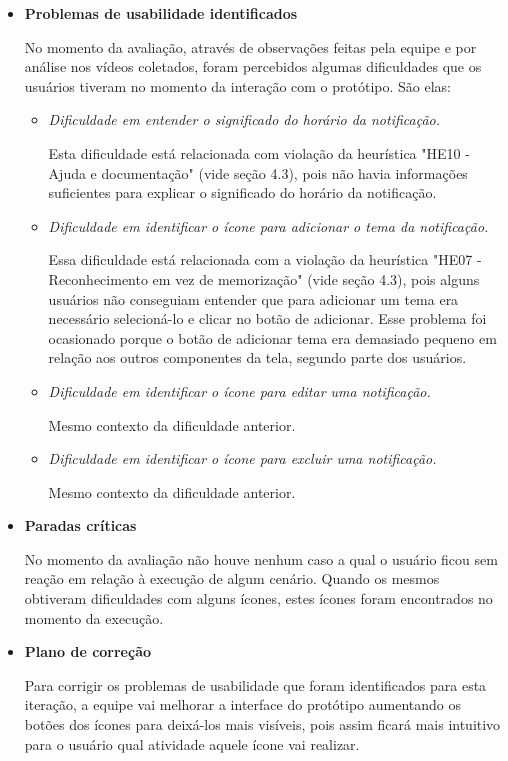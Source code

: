 \begin{itemize}
       \item \textbf{Problemas de usabilidade identificados}
       
	  \subitem No momento da avaliação, através de observações feitas pela equipe e por análise nos vídeos coletados,
	  foram percebidos algumas dificuldades que os usuários tiveram no momento da interação com o protótipo. São elas:
	  
	  \begin{itemize}
	  
	  \item \emph{Dificuldade em entender o significado do horário da notificação.}
	    
	    \subitem Esta dificuldade está relacionada com violação da heurística "HE10 - Ajuda e documentação" (vide seção 4.3),
	    pois não havia informações suficientes para explicar o significado do horário da notificação.
	  
	  \item \emph{Dificuldade em identificar o ícone para adicionar o tema da notificação.}
	    
	    \subitem Essa dificuldade está relacionada com a violação da heurística "HE07 - Reconhecimento em vez de memorização" (vide seção 4.3),
	    pois alguns usuários não conseguiam entender que para adicionar um tema era necessário selecioná-lo e clicar no botão de
	    adicionar. Esse problema foi ocasionado porque o botão de adicionar tema era demasiado pequeno em relação
	    aos outros componentes da tela, segundo parte dos usuários. 
	  
	  \item \emph{Dificuldade em identificar o ícone para editar uma notificação.}
	    
	    \subitem Mesmo contexto da dificuldade anterior.
	    
	  \item \emph{Dificuldade em identificar o ícone para excluir uma notificação.}
	    
	    \subitem Mesmo contexto da dificuldade anterior.
	  
	  \end{itemize}
       
       \item \textbf{Paradas críticas}
       
	  \subitem No momento da avaliação não houve nenhum caso a qual o usuário ficou sem reação em relação à execução de algum cenário. 
	  Quando os mesmos obtiveram dificuldades com alguns ícones, estes ícones foram encontrados no momento da execução.
       
       \item \textbf{Plano de correção}
       
	  \subitem Para corrigir os problemas de usabilidade que foram identificados para esta iteração, a equipe vai melhorar a
	  interface do protótipo aumentando os botões dos ícones para deixá-los mais visíveis, pois assim ficará mais intuitivo
	  para o usuário qual atividade aquele ícone vai realizar.
       
      \end{itemize}
      
